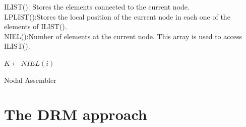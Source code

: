 \noindent
ILIST(): Stores the elements connected to the current node.\\
LPLIST():Stores the local position of the current node in each one of the elements of ILIST().\\
NIEL():Number of elements at the current node. This array is used to access ILIST().\\


\begin{algorithm}[H]
\SetAlgoLined
{}
{
$K\leftarrow NIEL(i)$
}
\caption{Nodal Assembler}
\end{algorithm}
\section{The DRM approach}





